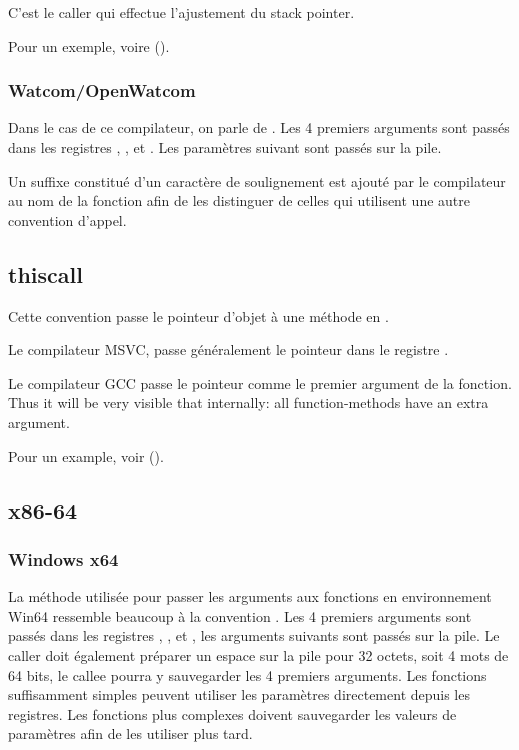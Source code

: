 C'est le \gls{caller} qui effectue l'ajustement du \gls{stack pointer}.

Pour un exemple, voire ().

\subsubsection{Watcom/OpenWatcom}

Dans le cas de ce compilateur, on parle de .
Les 4 premiers arguments sont passés dans les registres \EAX, \EDX, \EBX et \ECX.
Les paramètres suivant sont passés sur la pile.

Un suffixe constitué d'un caractère de soulignement est ajouté par le compilateur au nom de la
fonction afin de les distinguer de celles qui utilisent une autre convention d'appel.

\subsection{thiscall}

Cette convention passe le pointeur d'objet \ITthis à une méthode en \Cpp.

Le compilateur MSVC, passe généralement le pointeur \ITthis dans le registre \ECX.

Le compilateur GCC passe le pointeur \ITthis comme le premier argument de la fonction.
Thus it will be very visible that internally: all function-methods have an extra argument.

Pour un example, voir ().

\subsection{x86-64}

\subsubsection{Windows x64}
\label{sec:callingconventions_win64}

La méthode utilisée pour passer les arguments aux fonctions en environnement Win64 ressemble 
beaucoup à la convention .
Les 4 premiers arguments sont passés dans les registres \RCX, \RDX,  et , 
les arguments suivants sont passés sur la pile.
Le \gls{caller} doit également préparer un espace sur la pile pour 32 octets, soit 4 mots de 64 bits, 
le \gls{callee} pourra y sauvegarder les 4 premiers arguments.
Les fonctions suffisamment simples peuvent utiliser les paramètres directement depuis les registres. 
Les fonctions plus complexes doivent sauvegarder les valeurs de paramètres afin de les utiliser plus tard.

